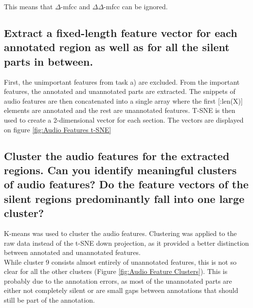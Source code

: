This means that $\Delta$-mfcc and $\Delta\Delta$-mfcc can be ignored.

\subsection{Extract a fixed-length feature vector for each annotated region as well as for all the silent parts in between. }
\label{sec:Audio Features:b}

First, the unimportant features from task a) are excluded. From the important features, the annotated and unannotated parts are extracted.
The snippets of audio features are then concatenated into a single array where the first [:len(X)] elements are annotated and the rest are unannotated features. T-SNE is then used to create a 2-dimensional vector for each section. The vectors are displayed on figure \ref{fig:Audio Features t-SNE} 


\subsection{Cluster the audio features for the extracted regions. Can you identify meaningful clusters of audio features? Do the feature vectors of the silent regions predominantly fall into one large cluster?}
\label{sec:Audio Feature Clusters}

K-means was used to cluster the audio features. Clustering was applied to the raw data instead of the t-SNE down projection, as it provided a better distinction between annotated and unannotated features.\\
While cluster 9 consists almost entirely of unannotated features, this is not so clear for all the other clusters (Figure \ref{fig:Audio Feature Clusters}). This is probably due to the annotation errors, as most of the unannotated parts are either not completely silent or are small gaps between annotations that should still be part of the annotation. 

